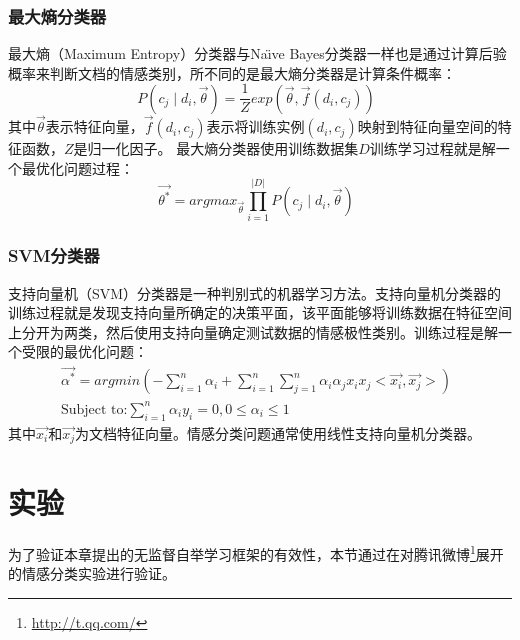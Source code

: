\subsubsection{最大熵分类器}
\label{entropy}
最大熵（Maximum Entropy）分类器与Na\"\i ve Bayes分类器一样也是通过计算后验概率来判断文档的情感类别，所不同的是最大熵分类器是计算条件概率：
\begin{equation}
\label{e5}
P \left( c_{j} \mid d_{i}, \overrightarrow{\theta} \right) = \frac{1}{Z}exp \left( \overrightarrow{\theta}, \overrightarrow{f} \left( d_{i},c_{j} \right) \right) \enspace
\end{equation}
其中$ \overrightarrow{\theta} $表示特征向量，$ \overrightarrow{f} \left( d_{i}, c_{j} \right)$表示将训练实例$ \left( d_{i}, c_{j} \right) $映射到特征向量空间的特征函数，$ Z $是归一化因子。
最大熵分类器使用训练数据集$ D $训练学习过程就是解一个最优化问题过程：
\begin{equation}
\label{e6}
\overrightarrow{\theta^{\ast}}=argmax_{\overrightarrow{\theta}}\prod_{i=1}^{|D|} P \left( c_{j} \mid d_{i}, \overrightarrow{\theta} \right) \enspace
\end{equation} 

\subsubsection{SVM分类器}
\label{svm}
支持向量机（SVM）分类器是一种判别式的机器学习方法。支持向量机分类器的训练过程就是发现支持向量所确定的决策平面，该平面能够将训练数据在特征空间上分开为两类，然后使用支持向量确定测试数据的情感极性类别。训练过程是解一个受限的最优化问题：
\begin{equation}
\label{e7}
\begin{aligned}
\overrightarrow{\alpha^{\ast}}=argmin \left( -\sum_{i=1}^{n}\alpha_{i} + \sum_{i=1}^{n} \sum_{j=1}^{n}\alpha_{i}\alpha_{j} x_{i}x_{j}<\overrightarrow{x_{i}},\overrightarrow{x_{j}}> \right)\\
\mbox{Subject to:} \sum_{i=1}^{n}\alpha_{i}y_{i}=0 , 0\leqslant \alpha_{i} \leqslant 1
\end{aligned} \enspace
\end{equation}
其中$ \overrightarrow{x_{i}}$和$\overrightarrow{x_{j}} $为文档特征向量。情感分类问题通常使用线性支持向量机分类器。

\section{实验}
\label{experiment}
为了验证本章提出的无监督自举学习框架的有效性，本节通过在对腾讯微博\footnote{\url{http://t.qq.com/}}展开的情感分类实验进行验证。

